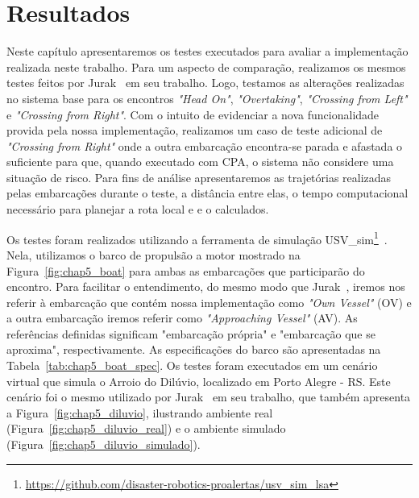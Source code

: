 \chapter{Resultados}\label{chap5:resultados}
    Neste capítulo apresentaremos os testes executados para avaliar a implementação realizada neste trabalho. Para um aspecto de comparação, realizamos os mesmos testes feitos por Jurak~\cite{Jurak2020COLREGS} em seu trabalho. Logo, testamos as alterações realizadas no sistema base para os encontros \textit{"Head On"}, \textit{"Overtaking"}, \textit{"Crossing from Left"} e \textit{"Crossing from Right"}. Com o intuito de evidenciar a nova funcionalidade provida pela nossa implementação, realizamos um caso de teste adicional de \textit{"Crossing from Right"} onde a outra embarcação encontra-se parada e afastada o suficiente para que, quando executado com CPA, o sistema não considere uma situação de risco. Para fins de análise apresentaremos as trajetórias realizadas pelas embarcações durante o teste, a distância entre elas, o tempo computacional necessário para planejar a rota local e \tcpa e o \dcpa calculados.
    
    Os testes foram realizados utilizando a ferramenta de simulação USV\_sim\footnote{\url{https://github.com/disaster-robotics-proalertas/usv_sim_lsa}}~\cite{Paravisi2018Toward}. Nela, utilizamos o barco de propulsão a motor mostrado na Figura~\ref{fig:chap5_boat} para ambas as embarcações que participarão do encontro. Para facilitar o entendimento, do mesmo modo que Jurak~\cite{Jurak2020COLREGS}, iremos nos referir à embarcação que contém nossa implementação como \textit{"Own Vessel"} (OV) e a outra embarcação iremos referir como \textit{"Approaching Vessel"} (AV). As referências definidas significam "embarcação própria" e "embarcação que se aproxima", respectivamente. As especificações do barco são apresentadas na Tabela~\ref{tab:chap5_boat_spec}. Os testes foram executados em um cenário virtual que simula o Arroio do Dilúvio, localizado em Porto Alegre - RS. Este cenário foi o mesmo utilizado por Jurak~\cite{Jurak2020COLREGS} em seu trabalho, que também apresenta a Figura~\ref{fig:chap5_diluvio}, ilustrando ambiente real (Figura~\ref{fig:chap5_diluvio_real}) e o ambiente simulado (Figura~\ref{fig:chap5_diluvio_simulado}).
    
